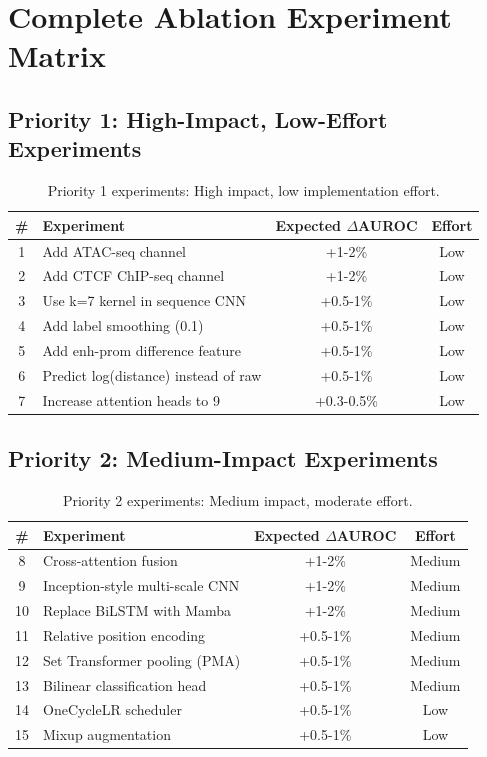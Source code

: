 \documentclass[11pt,a4paper]{article}
\begin{document}
\section{Complete Ablation Experiment Matrix}

\subsection{Priority 1: High-Impact, Low-Effort Experiments}

\begin{table}[H]
\centering
\begin{tabular}{clcc}
\toprule
\textbf{\#} & \textbf{Experiment} & \textbf{Expected $\Delta$AUROC} & \textbf{Effort} \\
\midrule
1 & Add ATAC-seq channel & +1-2\% & Low \\
2 & Add CTCF ChIP-seq channel & +1-2\% & Low \\
3 & Use k=7 kernel in sequence CNN & +0.5-1\% & Low \\
4 & Add label smoothing (0.1) & +0.5-1\% & Low \\
5 & Add enh-prom difference feature & +0.5-1\% & Low \\
6 & Predict log(distance) instead of raw & +0.5-1\% & Low \\
7 & Increase attention heads to 9 & +0.3-0.5\% & Low \\
\bottomrule
\end{tabular}
\caption{Priority 1 experiments: High impact, low implementation effort.}
\end{table}

\subsection{Priority 2: Medium-Impact Experiments}

\begin{table}[H]
\centering
\begin{tabular}{clcc}
\toprule
\textbf{\#} & \textbf{Experiment} & \textbf{Expected $\Delta$AUROC} & \textbf{Effort} \\
\midrule
8 & Cross-attention fusion & +1-2\% & Medium \\
9 & Inception-style multi-scale CNN & +1-2\% & Medium \\
10 & Replace BiLSTM with Mamba & +1-2\% & Medium \\
11 & Relative position encoding & +0.5-1\% & Medium \\
12 & Set Transformer pooling (PMA) & +0.5-1\% & Medium \\
13 & Bilinear classification head & +0.5-1\% & Medium \\
14 & OneCycleLR scheduler & +0.5-1\% & Low \\
15 & Mixup augmentation & +0.5-1\% & Low \\
\bottomrule
\end{tabular}
\caption{Priority 2 experiments: Medium impact, moderate effort.}
\end{table}
\end{document}
